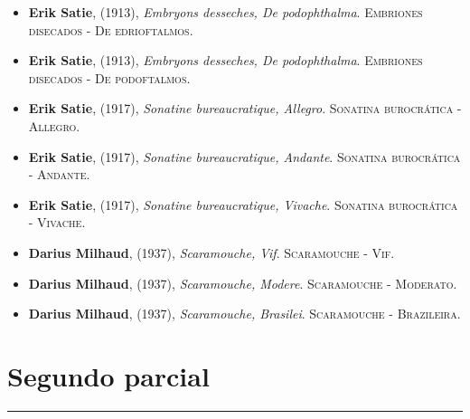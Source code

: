 \documentclass[paper=a4, fontsize=11pt, spanish]{scrartcl}
\numberwithin{equation}{section} %
\numberwithin{figure}{section} %
\numberwithin{table}{section} %
\newcommand{\horrule}[1]{\rule{\linewidth}{#1}}
\begin{document}
\begin{itemize}
\item \textbf{Erik Satie}, (1913), \textit{Embryons desseches, De podophthalma}.\textsc{ Embriones disecados - De edrioftalmos}. %
\item \textbf{Erik Satie}, (1913), \textit{Embryons desseches, De podophthalma}.\textsc{ Embriones disecados - De podoftalmos}. %
\item \textbf{Erik Satie}, (1917), \textit{Sonatine bureaucratique, Allegro}.\textsc{ Sonatina burocrática - Allegro}. %
\item \textbf{Erik Satie}, (1917), \textit{Sonatine bureaucratique, Andante}.\textsc{ Sonatina burocrática - Andante}. %
\item \textbf{Erik Satie}, (1917), \textit{Sonatine bureaucratique, Vivache}.\textsc{ Sonatina burocrática - Vivache}. %
\item \textbf{Darius Milhaud}, (1937), \textit{Scaramouche, Vif}.\textsc{ Scaramouche - Vif}. %
\item \textbf{Darius Milhaud}, (1937), \textit{Scaramouche, Modere}.\textsc{ Scaramouche - Moderato}. %
\item \textbf{Darius Milhaud}, (1937), \textit{Scaramouche, Brasilei}.\textsc{ Scaramouche - Brazileira}. %

\end{itemize}

\section{Segundo parcial}
\horrule{0.5pt}
\end{document}
